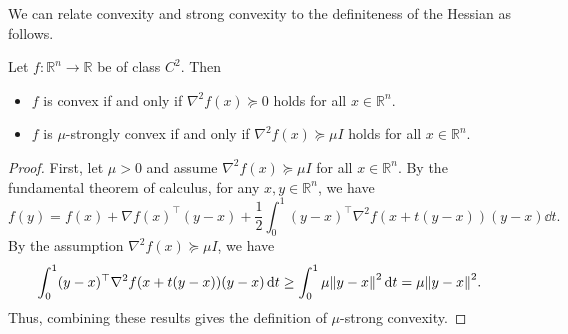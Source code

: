 \documentclass[0_en]{subfiles}
\begin{document}
We can relate convexity and strong convexity to the definiteness of the Hessian as follows.
\begin{proposition}\label{prop:convexity-hessian}
    Let $f \colon \mathbb{R}^n \to \mathbb{R}$ be of class $C^2$. Then
    \begin{itemize}
        \item $f$ is convex if and only if $\nabla^2 f(x)\succeq0$ holds for all $x \in \mathbb{R}^n$.
        \item $f$ is $\mu$-strongly convex if and only if $\nabla^2 f(x)\succeq\mu I$ holds for all $x \in \mathbb{R}^n$.
    \end{itemize}
\end{proposition}
\begin{proof}
    First, let $\mu>0$ and assume $\nabla^2 f(x)\succeq \mu I$ for all $x \in \mathbb{R}^n$.
    By the fundamental theorem of calculus, for any $x,y \in \mathbb{R}^n$, we have
    \begin{equation*}
        f(y)
        = f(x)+\nabla f(x)^\top (y-x)
        +\frac{1}{2} \int_0^1 (y-x)^\top \nabla^2 f(x+t(y-x))(y-x) \dd{t}.
    \end{equation*}
    By the assumption $\nabla^2 f(x)\succeq \mu I$, we have
    \begin{equation*}
        \int_0^1 (y-x)^\top \nabla^2 f(x+t(y-x))(y-x) \dd{t}
        \ge \int_0^1 \mu\norm{y-x}^2 \dd{t}
        = \mu\norm{y-x}^2.
    \end{equation*}
    Thus, combining these results gives the definition of $\mu$-strong convexity.


\end{proof}
\end{document}
